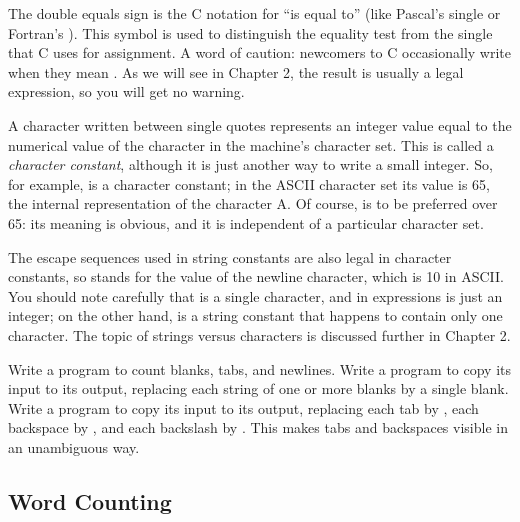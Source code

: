 The double equals sign \code{==} is the C notation for ``is equal to'' (like Pascal's single \code{=} or Fortran's ).
This symbol is used to distinguish the equality test from the single \code{=} that C uses for assignment.
A word of caution: newcomers to C occasionally write \code{=} when they mean \code{==}.
As we will see in Chapter 2, the result is usually a legal expression, so you will get no warning.

A character written between single quotes represents an integer value equal to the numerical value of the character in the machine's character set.
This is called a \emph{character constant}, although it is just another way to write a small integer.
So, for example,  is a character constant; in the ASCII character set its value is 65, the internal representation of the character \textsc{A}.
Of course,  is to be preferred over 65: its meaning is obvious, and it is independent of a particular character set.

The escape sequences used in string constants are also legal in character constants, so  stands for the value of the newline character, which is 10 in ASCII.
You should note carefully that  is a single character, and in expressions is just an integer; on the other hand,  is a string constant that happens to contain only one character.
The topic of strings versus characters is discussed further in Chapter 2.
\newline

\begin{ExerciseList}
\Exercise Write a program to count blanks, tabs, and newlines.
\Exercise Write a program to copy its input to its output, replacing each string of one or more blanks by a single blank.
\Exercise Write a program to copy its input to its output, replacing each tab by , each backspace by , and each backslash by \code{\textbackslash\textbackslash}. This makes tabs and backspaces visible in an unambiguous way.
\end{ExerciseList}


\subsection{Word Counting}


